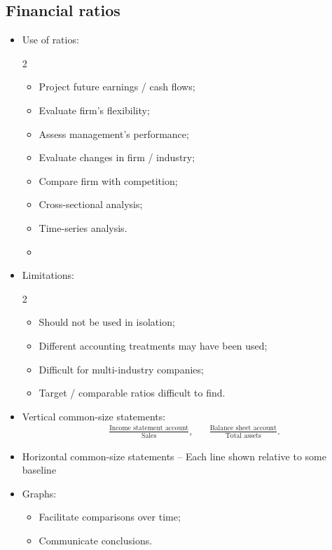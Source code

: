 \documentclass[../notes_compiled.tex]{subfiles}
\begin{document}
\subsection{Financial ratios}
\begin{itemize}
\item Use of ratios:
\begin{multicols}{2}
\begin{itemize}
\item Project future earnings / cash flows;
\item Evaluate firm's flexibility;
\item Assess management's performance;
\item Evaluate changes in firm / industry;
\item Compare firm with competition;
\item Cross-sectional analysis;
\item Time-series analysis.
\item[]
\end{itemize}
\end{multicols}

\item Limitations:
\begin{multicols}{2}
\begin{itemize}
\item Should not be used in isolation;
\item Different accounting treatments may have been used;
\item Difficult for multi-industry companies;
\item Target / comparable ratios difficult to find.
\end{itemize}
\end{multicols}

\item Vertical common-size statements:
\begin{align*}
&\frac{\text{Income statement account}}{\text{Sales}}, &
&\frac{\text{Balance sheet account}}{\text{Total assets}}.
\end{align*}

\item Horizontal common-size statements -- Each line shown relative to some baseline

\item Graphs:
\begin{itemize}
\item Facilitate comparisons over time;
\item Communicate conclusions.
\end{itemize}


\end{itemize}
\end{document}
